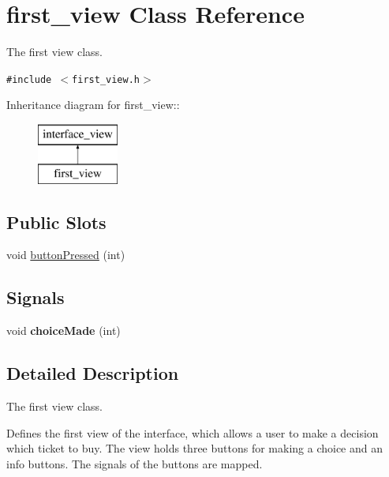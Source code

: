 \hypertarget{classfirst__view}{
\section{first\_\-view Class Reference}
\label{classfirst__view}
}
The first view class.  


{\tt \#include $<$first\_\-view.h$>$}

Inheritance diagram for first\_\-view::\begin{figure}[H]
\begin{center}
\leavevmode
\includegraphics[height=2cm]{classfirst__view}
\end{center}
\end{figure}
\subsection*{Public Slots}
\begin{CompactItemize}
\item 
void \hyperlink{classfirst__view_7b6e2b02361b8b92526de0e32ac987a3}{buttonPressed} (int)
\end{CompactItemize}
\subsection*{Signals}
\begin{CompactItemize}
\item 
\hypertarget{classfirst__view_cdd1b0ab3cdcade70c73f28d3014b244}{
void \textbf{choiceMade} (int)}
\label{classfirst__view_cdd1b0ab3cdcade70c73f28d3014b244}

\end{CompactItemize}


\subsection{Detailed Description}
The first view class. 

Defines the first view of the interface, which allows a user to make a decision which ticket to buy. The view holds three buttons for making a choice and an info buttons. The signals of the buttons are mapped. 


